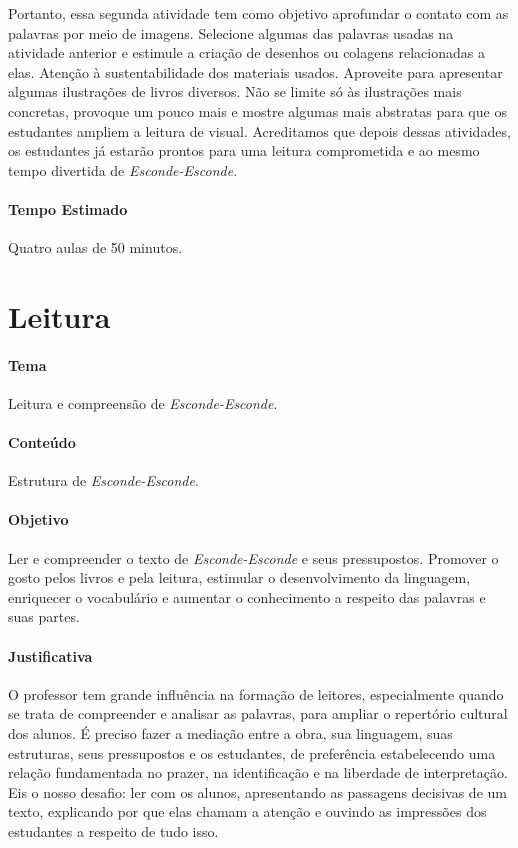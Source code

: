 \documentclass[11pt]{extarticle}
\begin{document}
Portanto, essa segunda atividade tem como objetivo aprofundar o contato com as palavras por meio de imagens. Selecione algumas das palavras usadas na atividade anterior e estimule a criação de desenhos ou colagens relacionadas a elas. Atenção à sustentabilidade dos materiais usados. Aproveite para apresentar algumas ilustrações de livros diversos. Não se limite só às ilustrações mais concretas, provoque um pouco mais e mostre algumas mais abstratas para que os estudantes ampliem a leitura de visual. Acreditamos que depois dessas atividades, os estudantes já estarão prontos para uma leitura comprometida e ao mesmo tempo divertida de \textit{Esconde-Esconde}. 

\paragraph{Tempo Estimado} Quatro aulas de 50 minutos. 

\section{Leitura}


\paragraph{Tema} Leitura e compreensão de \textit{Esconde-Esconde}.

\paragraph{Conteúdo} Estrutura de \textit{Esconde-Esconde}.  

\paragraph{Objetivo} Ler e compreender o texto de \textit{Esconde-Esconde} e seus pressupostos. Promover o gosto pelos livros e pela leitura, estimular o desenvolvimento da linguagem, enriquecer o vocabulário e aumentar o conhecimento a respeito das palavras e suas partes.   

\paragraph{Justificativa} O professor tem grande influência na formação de leitores, especialmente quando se trata de compreender e analisar as palavras, para ampliar o repertório cultural dos alunos. É preciso fazer a mediação entre a obra, sua linguagem, suas estruturas, seus pressupostos e os estudantes, de preferência estabelecendo uma relação fundamentada no prazer, na identificação e na liberdade de interpretação. Eis o nosso desafio: ler com os alunos, apresentando as passagens decisivas de um texto, explicando por que elas chamam a atenção e  ouvindo as impressões dos estudantes a respeito de tudo isso.  
\end{document}
